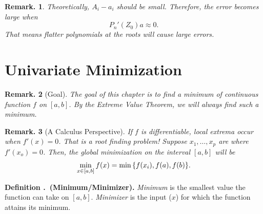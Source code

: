 \documentclass[12pt, a4paper]{article}
\newcounter{index}[subsection]
\newenvironment*{df}[1]{\par\noindent\textbf{Definition \thesubsection.\stepcounter{index}\theindex\ (#1).}}{\par}
\newtheorem{rmk}{Remark.}[section]
\begin{document}
\begin{rmk}
	Theoretically, $A_i-a_i$ should be small. Therefore, the error becomes large when \[P_n'(Z_0)a\approx0.\] That means flatter polynomials at the roots will cause large errors. 
\end{rmk}

\newpage
\section{Univariate Minimization}
\begin{rmk}[Goal]
	The goal of this chapter is to find a minimum of continuous function $f$ on $[a,b]$. By the Extreme Value Theorem, we will always find such a minimum.	
\end{rmk}
\begin{rmk}[A Calculus Perspective]
	If $f$ is differentiable, local extrema occur when $f'(x)=0$. That is a root finding problem! Suppose $x_1,\dots,x_p$ are where $f'(x_o)=0$. Then, the global minimization on the interval $[a,b]$ will be \[\min_{x\in[a,b]}f(x)=\min\qty{f(x_i),f(a),f(b)}.\]	
\end{rmk}
\begin{df}{Minimum/Minimizer}
	\textit{Minimum} is the smallest value the function can take on $[a,b]$. \textit{Minimizer} is the input ($x$) for which the function attains its minimum. 
\end{df}
\end{document}
